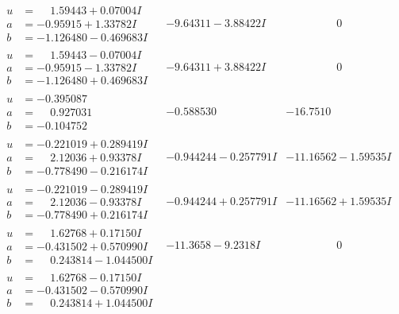 \documentclass[1p]{elsarticle_modified}
\theoremstyle{definition}
\begin{document}
$$\begin{array}{c|c|c}
 \hline 
\begin{aligned}
u &= \phantom{-}1.59443 + 0.07004 I \\
a &= -0.95915 + 1.33782 I \\
b &= -1.126480 - 0.469683 I\end{aligned}
 & -9.64311 - 3.88422 I & \phantom{-0.000000 } 0 \\ \hline\begin{aligned}
u &= \phantom{-}1.59443 - 0.07004 I \\
a &= -0.95915 - 1.33782 I \\
b &= -1.126480 + 0.469683 I\end{aligned}
 & -9.64311 + 3.88422 I & \phantom{-0.000000 } 0 \\ \hline\begin{aligned}
u &= -0.395087\phantom{ +0.000000I} \\
a &= \phantom{-}0.927031\phantom{ +0.000000I} \\
b &= -0.104752\phantom{ +0.000000I}\end{aligned}
 & -0.588530\phantom{ +0.000000I} & -16.7510\phantom{ +0.000000I} \\ \hline\begin{aligned}
u &= -0.221019 + 0.289419 I \\
a &= \phantom{-}2.12036 + 0.93378 I \\
b &= -0.778490 - 0.216174 I\end{aligned}
 & -0.944244 - 0.257791 I & -11.16562 - 1.59535 I \\ \hline\begin{aligned}
u &= -0.221019 - 0.289419 I \\
a &= \phantom{-}2.12036 - 0.93378 I \\
b &= -0.778490 + 0.216174 I\end{aligned}
 & -0.944244 + 0.257791 I & -11.16562 + 1.59535 I \\ \hline\begin{aligned}
u &= \phantom{-}1.62768 + 0.17150 I \\
a &= -0.431502 + 0.570990 I \\
b &= \phantom{-}0.243814 - 1.044500 I\end{aligned}
 & -11.3658 - 9.2318 I & \phantom{-0.000000 } 0 \\ \hline\begin{aligned}
u &= \phantom{-}1.62768 - 0.17150 I \\
a &= -0.431502 - 0.570990 I \\
b &= \phantom{-}0.243814 + 1.044500 I\end{aligned}

\end{array}$$
\end{document}
